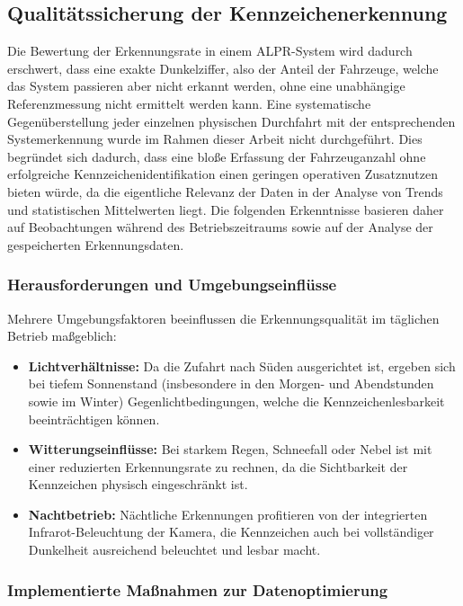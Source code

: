 \newpage
\subsection{Qualitätssicherung der Kennzeichenerkennung}
\label{sec:qs_alpr}

Die Bewertung der Erkennungsrate in einem ALPR-System wird dadurch erschwert, dass eine exakte Dunkelziffer, also der Anteil der Fahrzeuge, welche das System passieren aber nicht erkannt werden, ohne eine unabhängige Referenzmessung nicht ermittelt werden kann.
Eine systematische Gegenüberstellung jeder einzelnen physischen Durchfahrt mit der entsprechenden Systemerkennung wurde im Rahmen dieser Arbeit nicht durchgeführt.
Dies begründet sich dadurch, dass eine bloße Erfassung der Fahrzeuganzahl ohne erfolgreiche Kennzeichenidentifikation einen geringen operativen Zusatznutzen bieten würde, da die eigentliche Relevanz der Daten in der Analyse von Trends und statistischen Mittelwerten liegt.
Die folgenden Erkenntnisse basieren daher auf Beobachtungen während des Betriebszeitraums sowie auf der Analyse der gespeicherten Erkennungsdaten.

\subsubsection{Herausforderungen und Umgebungseinflüsse}

Mehrere Umgebungsfaktoren beeinflussen die Erkennungsqualität im täglichen Betrieb maßgeblich:

\begin{itemize}
    \item \textbf{Lichtverhältnisse:} Da die Zufahrt nach Süden ausgerichtet ist, ergeben sich bei tiefem Sonnenstand (insbesondere in den Morgen- und Abendstunden sowie im Winter) Gegenlichtbedingungen, welche die Kennzeichenlesbarkeit beeinträchtigen können.
    \item \textbf{Witterungseinflüsse:} Bei starkem Regen, Schneefall oder Nebel ist mit einer reduzierten Erkennungsrate zu rechnen, da die Sichtbarkeit der Kennzeichen physisch eingeschränkt ist.
    \item \textbf{Nachtbetrieb:} Nächtliche Erkennungen profitieren von der integrierten Infrarot-Beleuchtung der Kamera, die Kennzeichen auch bei vollständiger Dunkelheit ausreichend beleuchtet und lesbar macht.
\end{itemize}

\newpage
\subsubsection{Implementierte Maßnahmen zur Datenoptimierung}

